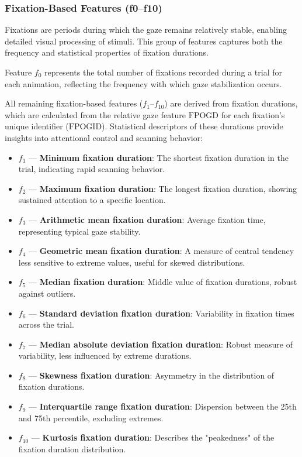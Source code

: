 \documentclass{article}
\begin{document}
\subsubsection{Fixation-Based Features (f0–f10)}

Fixations are periods during which the gaze remains relatively stable, enabling detailed visual processing of stimuli. 
This group of features captures both the frequency and statistical properties of fixation durations.  

Feature \(f_0\) represents the total number of fixations recorded during a trial for each animation, reflecting the frequency with which gaze stabilization occurs.  

All remaining fixation-based features (\(f_1\)–\(f_{10}\)) are derived from fixation durations, which are calculated from the relative gaze feature \(\mathrm{FPOGD}\) for each fixation's unique identifier (\(\mathrm{FPOGID}\)). 
Statistical descriptors of these durations provide insights into attentional control and scanning behavior:

\begin{itemize}
    \item \(f_1\) — \textbf{Minimum fixation duration}: The shortest fixation duration in the trial, indicating rapid scanning behavior.
    \item \(f_2\) — \textbf{Maximum fixation duration}: The longest fixation duration, showing sustained attention to a specific location.
    \item \(f_3\) — \textbf{Arithmetic mean fixation duration}: Average fixation time, representing typical gaze stability.
    \item \(f_4\) — \textbf{Geometric mean fixation duration}: A measure of central tendency less sensitive to extreme values, useful for skewed distributions.
    \item \(f_5\) — \textbf{Median fixation duration}: Middle value of fixation durations, robust against outliers.
    \item \(f_6\) — \textbf{Standard deviation fixation duration}: Variability in fixation times across the trial.
    \item \(f_7\) — \textbf{Median absolute deviation fixation duration}: Robust measure of variability, less influenced by extreme durations.
    \item \(f_8\) — \textbf{Skewness fixation duration}: Asymmetry in the distribution of fixation durations.
    \item \(f_9\) — \textbf{Interquartile range fixation duration}: Dispersion between the 25th and 75th percentile, excluding extremes.
    \item \(f_{10}\) — \textbf{Kurtosis fixation duration}: Describes the "peakedness" of the fixation duration distribution.
\end{itemize}
\end{document}
